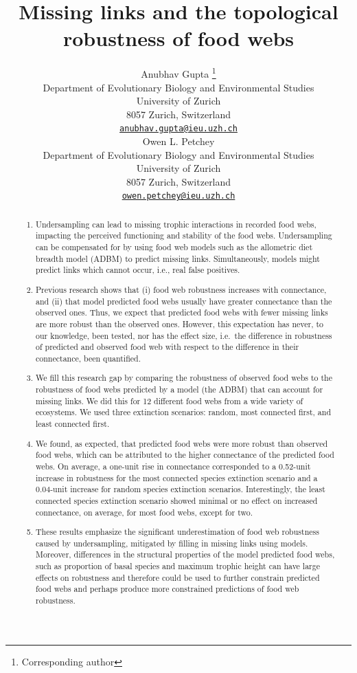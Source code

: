 \documentclass{article}
\title{Missing links and the topological robustness of food webs}
\author{
    Anubhav Gupta
    \thanks{Corresponding author}
   \\
    Department of Evolutionary Biology and Environmental Studies \\
    University of Zurich \\
  8057 Zurich, Switzerland \\
  \texttt{\href{mailto:anubhav.gupta@ieu.uzh.ch}{\nolinkurl{anubhav.gupta@ieu.uzh.ch}}} \\
   \And
    Owen L. Petchey
   \\
    Department of Evolutionary Biology and Environmental Studies \\
    University of Zurich \\
  8057 Zurich, Switzerland \\
  \texttt{\href{mailto:owen.petchey@ieu.uzh.ch}{\nolinkurl{owen.petchey@ieu.uzh.ch}}} \\
  }
\providecommand{\tightlist}{%
  \setlength{\itemsep}{0pt}\setlength{\parskip}{0pt}}
\begin{document}
\maketitle


\begin{abstract}
\begin{enumerate}
\def\labelenumi{\arabic{enumi})}
\tightlist
\item
  Undersampling can lead to missing trophic interactions in recorded
  food webs, impacting the perceived functioning and stability of the
  food webs. Undersampling can be compensated for by using food web
  models such as the allometric diet breadth model (ADBM) to predict
  missing links. Simultaneously, models might predict links which cannot
  occur, i.e., real false positives.
\item
  Previous research shows that (i) food web robustness increases with
  connectance, and (ii) that model predicted food webs usually have
  greater connectance than the observed ones. Thus, we expect that
  predicted food webs with fewer missing links are more robust than the
  observed ones. However, this expectation has never, to our knowledge,
  been tested, nor has the effect size, i.e.~the difference in
  robustness of predicted and observed food web with respect to the
  difference in their connectance, been quantified.
\item
  We fill this research gap by comparing the robustness of observed food
  webs to the robustness of food webs predicted by a model (the ADBM)
  that can account for missing links. We did this for 12 different food
  webs from a wide variety of ecosystems. We used three extinction
  scenarios: random, most connected first, and least connected first.
\item
  We found, as expected, that predicted food webs were more robust than
  observed food webs, which can be attributed to the higher connectance
  of the predicted food webs. On average, a one-unit rise in connectance
  corresponded to a 0.52-unit increase in robustness for the most
  connected species extinction scenario and a 0.04-unit increase for
  random species extinction scenarios. Interestingly, the least
  connected species extinction scenario showed minimal or no effect on
  increased connectance, on average, for most food webs, except for two.
\item
  These results emphasize the significant underestimation of food web
  robustness caused by undersampling, mitigated by filling in missing
  links using models. Moreover, differences in the structural properties
  of the model predicted food webs, such as proportion of basal species
  and maximum trophic height can have large effects on robustness and
  therefore could be used to further constrain predicted food webs and
  perhaps produce more constrained predictions of food web robustness.
\end{enumerate}
\end{abstract}
\end{document}
